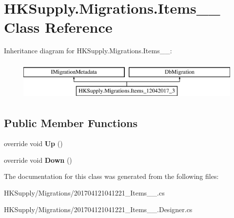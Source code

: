 \hypertarget{class_h_k_supply_1_1_migrations_1_1_items__12042017__3}{}\section{H\+K\+Supply.\+Migrations.\+Items\+\_\+\_ Class Reference}
\label{class_h_k_supply_1_1_migrations_1_1_items__12042017__3}
Inheritance diagram for H\+K\+Supply.\+Migrations.\+Items\+\_\+\_\+:\begin{figure}[H]
\begin{center}
\leavevmode
\includegraphics[height=2.000000cm]{class_h_k_supply_1_1_migrations_1_1_items__12042017__3}
\end{center}
\end{figure}
\subsection*{Public Member Functions}
\begin{DoxyCompactItemize}
\item 
\mbox{\label{class_h_k_supply_1_1_migrations_1_1_items__12042017__3_a2ec86ac91d1cc320e39fd5130944e0b7}} 
override void {\bfseries Up} ()
\item 
\mbox{\label{class_h_k_supply_1_1_migrations_1_1_items__12042017__3_a660e73741658e22ad88be7f547655e31}} 
override void {\bfseries Down} ()
\end{DoxyCompactItemize}


The documentation for this class was generated from the following files\+:\begin{DoxyCompactItemize}
\item 
H\+K\+Supply/\+Migrations/201704121041221\+\_\+\+Items\+\_\+\_.\+cs\item 
H\+K\+Supply/\+Migrations/201704121041221\+\_\+\+Items\+\_\+\_.\+Designer.\+cs\end{DoxyCompactItemize}
